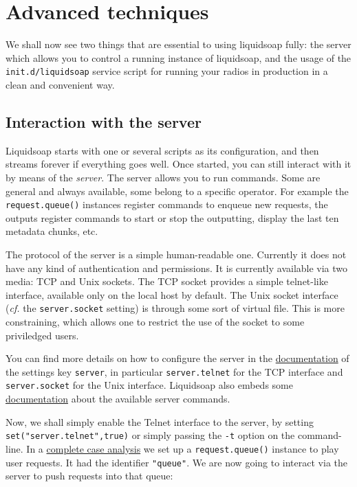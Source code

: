 \section{Advanced techniques}
We shall now see two things that are essential
to using liquidsoap fully: the server which allows you
to control a running instance of liquidsoap,
and the usage of the \verb+init.d/liquidsoap+ service script
for running your radios in production in a clean and convenient way.

\subsection{Interaction with the server}
Liquidsoap starts with one or several scripts as its configuration,
and then streams forever if everything goes well.
Once started, you can still interact with it by means of the \emph{server}.
The server allows you to run commands. Some are general and always available,
some belong to a specific operator. For example the \verb+request.queue()+ instances register commands to enqueue new requests, the outputs register commands
to start or stop the outputting, display the last ten metadata chunks, etc.

The protocol of the server is a simple human-readable one.
Currently it does not have any kind of authentication and permissions.
It is currently available via two media: TCP and Unix sockets.
The TCP socket provides a simple telnet-like interface, available only on
the local host by default.
The Unix socket interface (\emph{cf.} the \verb+server.socket+ setting)
is through some sort of virtual file.
This is more constraining, which allows one to restrict the use of the socket
to some priviledged users.

You can find more details on how to configure the server in the
\href{help.html#settings}{documentation} of the settings key \verb+server+,
in particular \verb+server.telnet+ for the TCP interface and \verb+server.socket+
for the Unix interface.
Liquidsoap also embeds some \href{help.html#server}{documentation}
about the available server commands.

Now, we shall simply enable the Telnet interface to the server,
by setting \verb+set("server.telnet",true)+ or simply passing the \verb+-t+ option on
the command-line.
In a \href{complete_case.html}{complete case analysis} we set up a \verb+request.queue()+
instance to play user requests. It had the identifier \verb+"queue"+.
We are now going to interact via the server to push requests into that queue:

